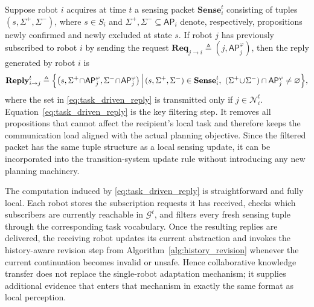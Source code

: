 Suppose robot $i$ acquires at time $t$ a sensing packet
$\mathbf{Sense}_{i}^{t}$ consisting of tuples
$(s,\Sigma^{+},\Sigma^{-})$, where
$s \in S_{i}$ and $\Sigma^{+},\Sigma^{-} \subseteq \mathsf{AP}_{i}$ denote,
respectively, propositions newly confirmed and newly excluded at state $s$.
If robot $j$ has previously subscribed to robot $i$ by sending the request
$\mathbf{Req}_{j \rightarrow i} \triangleq (j,\mathsf{AP}_{j}^{\varphi})$,
then the reply generated by robot $i$ is
\begin{equation}
\mathbf{Reply}_{i \rightarrow j}^{t} \triangleq
\Bigl\{ \bigl(s,\Sigma^{+}\!\cap\!\mathsf{AP}_{j}^{\varphi},
\Sigma^{-}\!\cap\!\mathsf{AP}_{j}^{\varphi}\bigr) \,\Big|\,
(s,\Sigma^{+},\Sigma^{-}) \in \mathbf{Sense}_{i}^{t},\
(\Sigma^{+}\!\cup\!\Sigma^{-}) \cap \mathsf{AP}_{j}^{\varphi}
\neq \varnothing \Bigr\},
\label{eq:task_driven_reply}
\end{equation}
where the set in \eqref{eq:task_driven_reply} is transmitted only if
$j \in \mathcal{N}_{i}^{t}$.
Equation~\eqref{eq:task_driven_reply} is the key filtering step. It removes all
propositions that cannot affect the recipient's local task and therefore keeps
the communication load aligned with the actual planning objective. Since the
filtered packet has the same tuple structure as a local sensing update, it can
be incorporated into the transition-system update rule without introducing any
new planning machinery.

The computation induced by \eqref{eq:task_driven_reply} is straightforward and
fully local. Each robot stores the subscription requests it has received, checks
which subscribers are currently reachable in $\mathcal{G}^{t}$, and filters
every fresh sensing tuple through the corresponding task vocabulary. Once the
resulting replies are delivered, the receiving robot updates its current
abstraction and invokes the history-aware revision step from
Algorithm~\ref{alg:history_revision} whenever the current continuation becomes
invalid or unsafe. Hence collaborative knowledge transfer does not replace the
single-robot adaptation mechanism; it supplies additional evidence that enters
that mechanism in exactly the same format as local perception.

